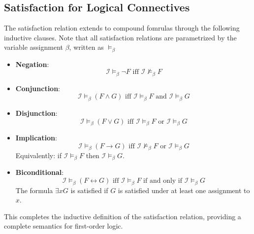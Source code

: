 \documentclass[a4paper]{article}
\theoremstyle{definition}
\begin{document}
\subsection{Satisfaction for Logical Connectives}
The satisfaction relation extends to compound fomrulas through the following inductive clauses. Note that all satisfaction relations 
are parametrized by the variable assignment \( \beta \), written as \( \models_{\beta} \)
\begin{itemize}
	\item \textbf{Negation}:
	\[
	  \mathcal{I} \models_{\beta} \lnot F \text{ iff } \mathcal{I} \nvDash_{\beta} F 
	\]
	\item \textbf{Conjunction}: 
	\[
	  \mathcal{I} \models_{\beta} (F \wedge G) \text{ iff } \mathcal{I} \models_{\beta} F \text{ and } \mathcal{I} \models_{\beta} G
	\]
	\item \textbf{Disjunction}:
	\[
	  \mathcal{I} \models_{\beta} (F \vee G) \text{ iff } \mathcal{I} \models_{\beta} F \text{ or } \mathcal{I} \models_{\beta} G
	\]
	\item \textbf{Implication}:
	\[
	  \mathcal{I} \models_{\beta} (F \rightarrow G) \text{ iff } \mathcal{I} \nvDash_{\beta} F \text{ or } \mathcal{I} \models_{\beta} G 
	\]
	Equivalently: if \( \mathcal{I} \models_{\beta} F \) then \( \mathcal{I} \models_{\beta} G \).
	\item \textbf{Biconditional}:
	\[
	  \mathcal{I} \models_{\beta} (F \leftrightarrow G) \text{ iff } \mathcal{I} \models_{\beta} F \text{ if and only if } \mathcal{I} \models_{\beta} G
	\]
	The formula \( \exists x G \) is satisfied if \( G \) is satisfied under at least one assignment to \( x \).
\end{itemize}
This completes the inductive definition of the satisfaction relation, providing a complete semantics for first-order logic.
\end{document}
